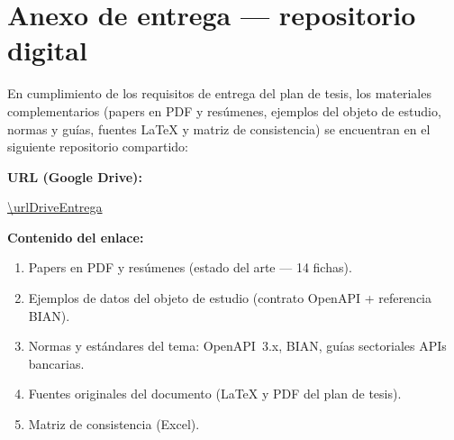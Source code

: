 \cleardoublepage
\chapter*{Anexo de entrega — repositorio digital}
\thispagestyle{empty}

\noindent
En cumplimiento de los requisitos de entrega del plan de tesis, los materiales complementarios
(papers en PDF y resúmenes, ejemplos del objeto de estudio, normas y guías, fuentes LaTeX y matriz
de consistencia) se encuentran en el siguiente repositorio compartido:

\vspace{0.8cm}
\noindent\textbf{URL (Google Drive):}\par
\vspace{0.3cm}
\noindent\url{\urlDriveEntrega}

\vspace{0.8cm}
\noindent\textbf{Contenido del enlace:}
\begin{enumerate}
  \item Papers en PDF y resúmenes (estado del arte — 14 fichas).
  \item Ejemplos de datos del objeto de estudio (contrato OpenAPI + referencia BIAN).
  \item Normas y estándares del tema: OpenAPI~3.x, BIAN, guías sectoriales APIs bancarias.
  \item Fuentes originales del documento (LaTeX y PDF del plan de tesis).
  \item Matriz de consistencia (Excel).
\end{enumerate}

